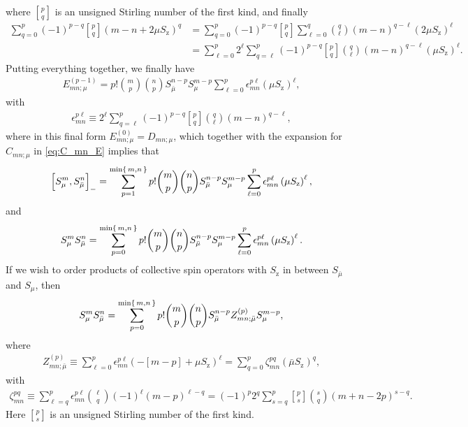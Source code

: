 \documentclass[pra,twocolumn,longbibliography]{revtex4-2}
\newcommand{\p}[1]{\left( #1 \right)} %
\renewcommand{\sp}[1]{\left[ #1 \right]} %
\newcommand{\z}{\text{z}}
\newcommand{\bmu}{{\bar\mu}}
\newcommand{\1}{\mathds{1}}
\begin{document}
where ${ p \brack q }$ is an unsigned Stirling number of the first
kind, and finally
\begin{align}
  \sum_{q=0}^p \p{-1}^{p-q} { p \brack q } \p{m-n+2\mu S_\z}^q
  &= \sum_{q=0}^p \p{-1}^{p-q} { p \brack q } \sum_{\ell=0}^q
  { q \choose \ell } \p{m-n}^{q-\ell} \p{2\mu S_\z}^\ell \\
  &= \sum_{\ell=0}^p 2^\ell \sum_{q=\ell}^p \p{-1}^{p-q}
  { p \brack q } { q \choose \ell } \p{m-n}^{q-\ell} \p{\mu S_\z}^\ell.
\end{align}
Putting everything together, we finally have
\begin{align}
  E_{mn;\mu}^{(p-1)}
  = p! { m \choose p } { n \choose p }
  S_\bmu^{n-p} S_\mu^{m-p}
  \sum_{\ell=0}^p \epsilon_{mn}^{p\ell} \p{\mu S_\z}^\ell,
\end{align}
with
\begin{align}
  \epsilon_{mn}^{p\ell}
  \equiv 2^\ell \sum_{q=\ell}^p \p{-1}^{p-q}
  { p \brack q } { q \choose \ell } \p{m-n}^{q-\ell},
\end{align}
where in this final form $E_{mn;\mu}^{(0)} = D_{mn;\mu}$, which
together with the expansion for $C_{mn;\mu}$ in \eqref{eq:C_mn_E}
implies that
\begin{align}
  \sp{S_\mu^m, S_\bmu^n}_-
  = \sum_{p=1}^{\min\set{m,n}}
  p! { m \choose p } { n \choose p } S_\bmu^{n-p} S_\mu^{m-p}
  \sum_{\ell=0}^p \epsilon_{mn}^{p\ell} \p{\mu S_\z}^\ell,
  \label{eq:comm_mu}
\end{align}
and
\begin{align}
  S_\mu^m S_\bmu^n
  = \sum_{p=0}^{\min\set{m,n}}
  p! { m \choose p } { n \choose p } S_\bmu^{n-p} S_\mu^{m-p}
  \sum_{\ell=0}^p \epsilon_{mn}^{p\ell} \p{\mu S_\z}^\ell.
  \label{eq:push_mu_bmu}
\end{align}
If we wish to order products of collective spin operators with $S_\z$
in between $S_\bmu$ and $S_\mu$, then
\begin{align}
  S_\mu^m S_\bmu^n
  = \sum_{p=0}^{\min\set{m,n}} p! { m \choose p } { n \choose p }
  S_\bmu^{n-p} Z_{mn;\bmu}^{(p)} S_\mu^{m-p},
\end{align}
where
\begin{align}
  Z_{mn;\bmu}^{(p)}
  \equiv \sum_{\ell=0}^p \epsilon_{mn}^{p\ell}
  \p{-\sp{m-p} + \mu S_\z}^\ell
  = \sum_{q=0}^p \zeta_{mn}^{pq} \p{\bmu S_\z}^q,
  \label{eq:Z_mnp}
\end{align}
with
\begin{align}
  \zeta_{mn}^{pq}
  \equiv \sum_{\ell=q}^p \epsilon_{mn}^{p\ell}
  { \ell \choose q } \p{-1}^\ell \p{m-p}^{\ell-q}
  = \p{-1}^p 2^q \sum_{s=q}^p
  { p \brack s } { s \choose q } \p{m+n-2p}^{s-q}.
  \label{eq:zeta_mnpq}
\end{align}
Here ${ p \brack s }$ is an unsigned Stirling number of the first
kind.
\end{document}
